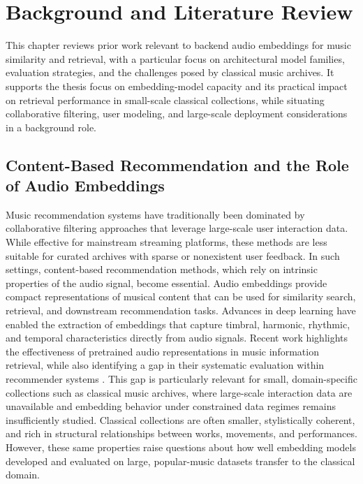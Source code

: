 \chapter{Background and Literature Review}

This chapter reviews prior work relevant to backend audio embeddings for music similarity and retrieval, with a particular focus on architectural model families, evaluation strategies, and the challenges posed by classical music archives. 
It supports the thesis focus on embedding-model capacity and its practical impact on retrieval performance in small-scale classical collections, while situating collaborative filtering, user modeling, and large-scale deployment considerations in a background role.

\section{Content-Based Recommendation and the Role of Audio Embeddings}

Music recommendation systems have traditionally been dominated by collaborative filtering approaches that leverage large-scale user interaction data. While effective for mainstream streaming platforms, these methods are less suitable for curated archives with sparse or nonexistent user feedback. In such settings, content-based recommendation methods, which rely on intrinsic properties of the audio signal, become essential.
Audio embeddings provide compact representations of musical content that can be used for similarity search, retrieval, and downstream recommendation tasks. Advances in deep learning have enabled the extraction of embeddings that capture timbral, harmonic, rhythmic, and temporal characteristics directly from audio signals.
Recent work highlights the effectiveness of pretrained audio representations in music information retrieval, while also identifying a gap in their systematic evaluation within recommender systems \cite{tamm2024}. 
This gap is particularly relevant for small, domain-specific collections such as classical music archives, where large-scale interaction data are unavailable and embedding behavior under constrained data regimes remains insufficiently studied.
Classical collections are often smaller, stylistically coherent, and rich in structural relationships between works, movements, and performances. However, these same properties raise questions about how well embedding models developed and evaluated on large, popular-music datasets transfer to the classical domain.


